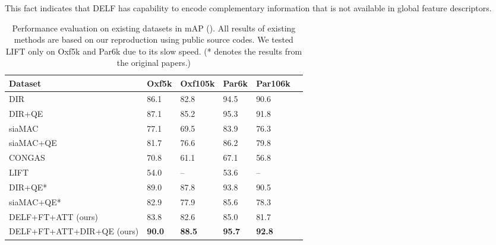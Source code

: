 \documentclass[10pt,twocolumn,letterpaper]{article}
\begin{document}
This fact indicates that DELF has capability to encode complementary information that is not available in global feature descriptors.\begin{table}[t]
\footnotesize                                                                                                                                                                                                                
\centering     
\caption{Performance evaluation on existing datasets in mAP ().  All results of existing methods are based on our reproduction using public source codes.  We tested LIFT only on Oxf5k and Par6k due to its slow speed.  (* denotes the results from the original papers.)}
\vspace{-5pt}
\begin{tabular}{@{\hskip0.0pt}l@{\hskip2.5pt}|C{0.7cm}C{0.7cm}C{0.7cm}C{0.7cm}l@{\hskip0.0pt}}         
  \toprule                                                                                                                                                                                                                                                                      
Dataset & Oxf5k & Oxf105k & Par6k & Par106k \\     
  \midrule     
DIR~\cite{gordo2016deep} & 86.1 &  82.8   &    94.5     &     90.6   \\
DIR+QE~\cite{gordo2016deep} & 87.1 & 85.2 &   95.3    &   91.8   \\
siaMAC~\cite{radenovic2016cnn} & 77.1 & 69.5   & 83.9     & 76.3      \\
siaMAC+QE~\cite{radenovic2016cnn} & 81.7 & 76.6   & 86.2         &  79.8      \\
CONGAS~\cite{buddemeier2012systems} & 70.8 & 61.1 & 67.1 &  56.8  \\
LIFT~\cite{yi2016lift} & 54.0 & -- & 53.6 &  --  \\
\midrule
DIR+QE*~\cite{gordo2016deep} & 89.0 & 87.8 &   93.8     &   90.5   \\
siaMAC+QE*~\cite{radenovic2016cnn} & 82.9 & 77.9   & 85.6         &  78.3      \\
\midrule
DELF+FT+ATT (ours) & 83.8 & 82.6 & 85.0 & 81.7 \\
DELF+FT+ATT+DIR+QE (ours) & {\bf 90.0} & {\bf 88.5} & {\bf 95.7} & {\bf 92.8} \\
  \bottomrule            
\end{tabular}                                                                                                                                                                                                                                                                        
\label{tab:100k_results}    
\vspace{-10pt}                                                                                                                                                                                                           
\end{table}
 
\end{document}
